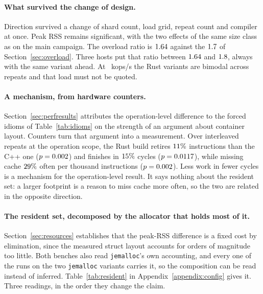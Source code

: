 \documentclass[english,oneside,a4paper,censored,csm,software-track-2020]{HYthesisML}
\begin{document}
\paragraph{What survived the change of design.}
Direction survived a change of shard count, load grid, repeat count and compiler at once. Peak
RSS remains significant, with the two effects of the same size class as on the main campaign.
The overload ratio is $1.64$ against the $1.7$ of
Section~\ref{sec:overload}. Three hosts put that ratio between $1.64$ and
$1.8$, always with the same variant ahead. At \BmMetastableLoad{}~kops/s the
Rust variants are bimodal across repeats and that load must not be quoted.

\paragraph{A mechanism, from hardware counters.}
Section~\ref{sec:perfresults} attributes the operation-level difference to the forced idioms of
Table~\ref{tab:idioms} on the strength of an argument about container layout. Counters turn that
argument into a measurement. Over \BmCounterRepeats{} interleaved repeats at the operation
scope, the Rust build retires $11\%$ \BmInstrDeltaDir{} instructions than the C++ one
($p=0.002$) and finishes in $15\%$ \BmCycleDeltaDir{} cycles
($p=0.0117$), while missing cache $29\%$ \BmMissDeltaDir{} often per thousand
instructions ($p=0.002$). Less work in fewer cycles is a mechanism for the
operation-level result. It says nothing about the resident set: a larger footprint is a reason
to miss cache more often, so the two are related in the opposite direction.

\paragraph{The resident set, decomposed by the allocator that holds most of it.}
Section~\ref{sec:resources} establishes that the peak-RSS difference is a fixed cost by
elimination, since the measured struct layout accounts for orders of magnitude too little. Both
benches also read \texttt{jemalloc}'s own accounting, and every one of the \BmJeRuns{} runs on the
two \texttt{jemalloc} variants carries it, so the composition can be read instead of inferred.
Table~\ref{tab:resident} in Appendix~\ref{appendix:config} gives it. Three readings, in the order
they change the claim.
\end{document}
